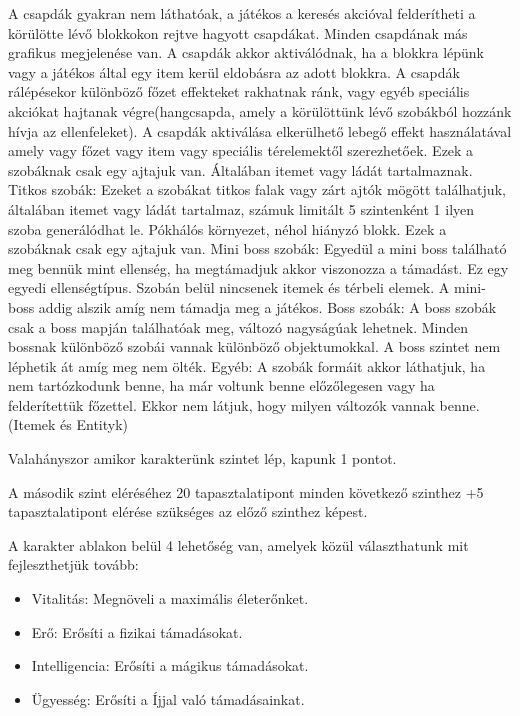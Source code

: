 A csapdák gyakran nem láthatóak, a játékos a keresés akcióval felderítheti a körülötte lévő blokkokon rejtve hagyott csapdákat.
Minden csapdának más grafikus megjelenése van.
A csapdák akkor aktiválódnak, ha a blokkra lépünk vagy a játékos által egy item kerül eldobásra az adott blokkra.
A csapdák rálépésekor különböző főzet effekteket rakhatnak ránk, vagy egyéb speciális akciókat hajtanak végre(hangcsapda, amely a körülöttünk lévő szobákból hozzánk hívja az ellenfeleket).
A csapdák aktiválása elkerülhető lebegő effekt használatával amely vagy főzet vagy item vagy speciális térelemektől szerezhetőek. Ezek a szobáknak csak egy ajtajuk van. Általában itemet vagy ládát tartalmaznak.
Titkos szobák:
Ezeket a szobákat titkos falak vagy zárt ajtók mögött találhatjuk, általában itemet vagy ládát tartalmaz, számuk limitált 5 szintenként 1 ilyen szoba generálódhat le. Pókhálós környezet, néhol hiányzó blokk. Ezek a szobáknak csak egy ajtajuk van.
Mini boss szobák:
Egyedül a mini boss található meg bennük mint ellenség, ha megtámadjuk akkor viszonozza a támadást. Ez egy egyedi ellenségtípus. Szobán belül nincsenek itemek és térbeli elemek.
A mini-boss addig alszik amíg nem támadja meg a játékos.
Boss szobák:
A boss szobák csak a boss mapján találhatóak meg, változó nagyságúak lehetnek.
Minden bossnak különböző szobái vannak különböző objektumokkal.
A boss szintet nem léphetik át amíg meg nem ölték.
Egyéb:
A szobák formáit akkor láthatjuk, ha nem tartózkodunk benne, ha már voltunk benne előzőlegesen vagy ha felderítettük főzettel. Ekkor nem látjuk, hogy milyen változók vannak benne. (Itemek és Entityk)


Valahányszor amikor karakterünk szintet lép, kapunk 1 pontot.

A második szint eléréséhez 20 tapasztalatipont minden következő szinthez +5 tapasztalatipont elérése szükséges az előző szinthez képest.

A karakter ablakon belül 4 lehetőség van, amelyek közül választhatunk mit fejleszthetjük tovább:
\begin{itemize}
    \item Vitalitás: Megnöveli a maximális életerőnket.
    \item Erő: Erősíti a fizikai támadásokat.
    \item Intelligencia: Erősíti a mágikus támadásokat.
    \item Ügyesség: Erősíti a Íjjal való támadásainkat.
\end{itemize}

